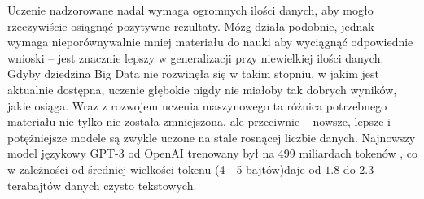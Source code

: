 Uczenie nadzorowane nadal wymaga ogromnych ilości danych, aby mogło rzeczywiście osiągnąć pozytywne rezultaty.
Mózg działa podobnie, jednak wymaga nieporównywalnie mniej materiału do nauki aby wyciągnąć odpowiednie wnioski -- jest znacznie lepszy w generalizacji przy niewielkiej ilości danych.
Gdyby dziedzina Big Data nie rozwinęła się w takim stopniu, w jakim jest aktualnie dostępna, uczenie głębokie nigdy nie miałoby tak dobrych wyników, jakie osiąga.
Wraz z rozwojem uczenia maszynowego ta różnica potrzebnego materiału nie tylko nie została zmniejszona, ale przeciwnie -- nowsze, lepsze i potężniejsze modele są zwykle uczone na stale rosnącej liczbie danych.
Najnowszy model językowy GPT-3 od OpenAI trenowany był na 499 miliardach tokenów \cite{brown2020language}, co w zależności od średniej wielkości tokenu (4 - 5 bajtów)\footnotemark daje od \(1.8\) do \(2.3\) terabajtów danych czysto tekstowych.

